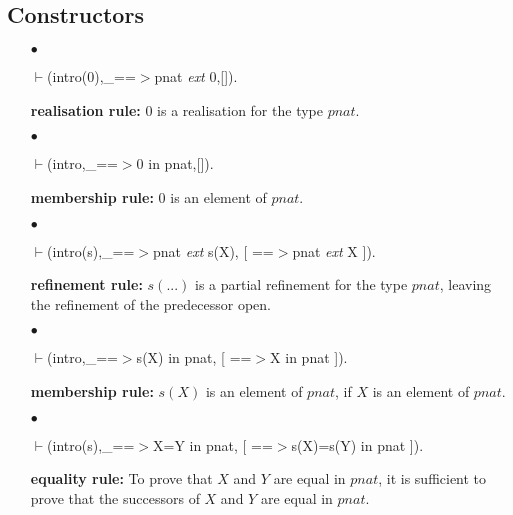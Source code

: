 \documentclass[11pt]{report}
\begin{document}
 \subsection{Constructors}
 \begin{enumerate}
 \item[$\bullet$]
\begin{sf}\begin{tabbing}
$\vdash$(intro(0),\_\hspace{0.1em}==$>$pnat \mbox{\it ext} 0,[]).
\end{tabbing}\end{sf}

 {\bf realisation rule:} 
 $0$ is a realisation for the type $pnat$.
  
 \item[$\bullet$]
\begin{sf}\begin{tabbing}
$\vdash$(intro,\_\hspace{0.1em}==$>$0 in pnat,[]).
\end{tabbing}\end{sf}

 {\bf membership rule:} 
 $0$ is an element of $pnat$.
  
 \item[$\bullet$]
\begin{sf}\begin{tabbing}
$\vdash$(intro(s),\_\hspace{0.1em}==$>$pnat \mbox{\it ext} s(X), [ ==$>$pnat \mbox{\it ext} X ]).
\end{tabbing}\end{sf}

 {\bf refinement rule:} 
 $s(...)$ is a partial refinement for the type $pnat$,
 leaving the refinement of the predecessor open. 
  
 \item[$\bullet$]
\begin{sf}\begin{tabbing}
$\vdash$(intro,\_\hspace{0.1em}==$>$s(X) in pnat, [ ==$>$X in pnat ]).
\end{tabbing}\end{sf}

 {\bf membership rule:} 
 $s(X)$ is an element of $pnat$, if $X$ is an element of $pnat$.
 \item[$\bullet$]
\begin{sf}\begin{tabbing}
$\vdash$(intro(s),\_\hspace{0.1em}==$>$X=Y in pnat, [ ==$>$s(X)=s(Y) in pnat ]).
\end{tabbing}\end{sf}

 {\bf equality rule:}
 To prove that $X$ and $Y$ are equal in $pnat$,
 it is sufficient to prove that the successors of $X$ and $Y$ are equal in 
 $pnat$. 
 \end{enumerate}
  
\end{document}
